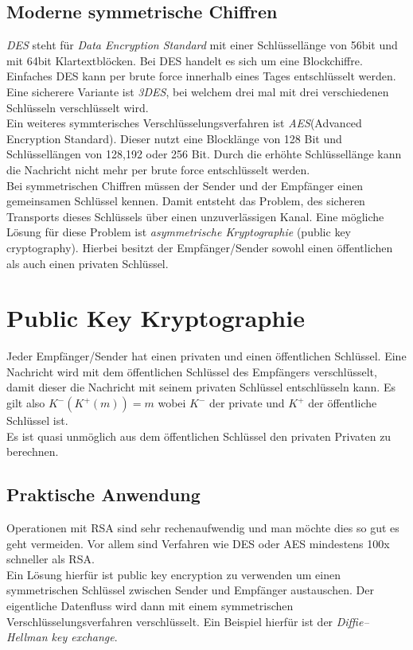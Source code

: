 \subsection{Moderne symmetrische Chiffren}
\emph{DES} steht für \textit{Data Encryption Standard} mit einer Schlüssellänge von 56bit und mit 64bit Klartextblöcken. Bei DES handelt es sich um eine Blockchiffre. Einfaches DES kann per brute force innerhalb eines Tages entschlüsselt werden. Eine sicherere Variante ist \emph{3DES}, bei welchem drei mal mit drei verschiedenen Schlüsseln verschlüsselt wird.\\
Ein weiteres symmterisches Verschlüsselungsverfahren ist \emph{AES}(Advanced Encryption Standard). Dieser nutzt eine Blocklänge von 128 Bit und Schlüssellängen von 128,192 oder 256 Bit. Durch die erhöhte Schlüssellänge kann die Nachricht nicht mehr per brute force entschlüsselt werden.\\
\hfill\break
Bei symmetrischen Chiffren müssen der Sender und der Empfänger einen gemeinsamen Schlüssel kennen. Damit entsteht das Problem, des sicheren Transports dieses Schlüssels über einen unzuverlässigen Kanal. Eine mögliche Lösung für diese Problem ist \emph{asymmetrische Kryptographie} (public key cryptography). Hierbei besitzt der Empfänger/Sender sowohl einen öffentlichen als auch einen privaten Schlüssel.

\section{Public Key Kryptographie}
Jeder Empfänger/Sender hat einen privaten und einen öffentlichen Schlüssel. Eine Nachricht wird mit dem öffentlichen Schlüssel des Empfängers verschlüsselt, damit dieser die Nachricht mit seinem privaten Schlüssel entschlüsseln kann. Es gilt also $K^-(K^+(m))=m$ wobei $K^-$ der private und $K^+$ der öffentliche Schlüssel ist.\\
Es ist quasi unmöglich aus dem öffentlichen Schlüssel den privaten Privaten zu berechnen.

\subsection{Praktische Anwendung}
Operationen mit RSA sind sehr rechenaufwendig und man möchte dies so gut es geht vermeiden. Vor allem sind Verfahren wie DES oder AES mindestens 100x schneller als RSA.\\
Ein Lösung hierfür ist public key encryption zu verwenden um einen symmetrischen Schlüssel zwischen Sender und Empfänger austauschen. Der eigentliche Datenfluss wird dann mit einem symmetrischen Verschlüsselungsverfahren verschlüsselt.
Ein Beispiel hierfür ist der \emph{Diffie–Hellman key exchange}.

